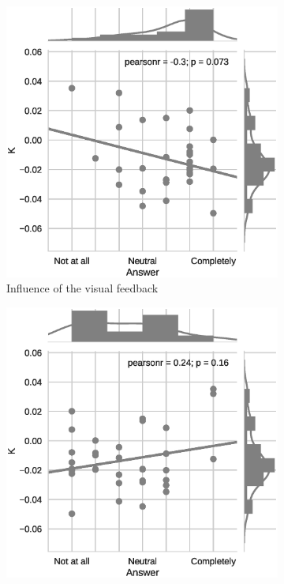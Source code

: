 \begin{figure}[t]
	\centering
	\begin{subfigure}[t]{.48\columnwidth}
		\centering        
		\includegraphics[trim={0cm 0cm 1cm 0cm},clip,width=\textwidth]{img/compelling}
		\caption{Influence of the visual feedback}
		\label{subfig:compelling}
	\end{subfigure}
	\begin{subfigure}[t]{.48\columnwidth}
		\centering        
		\includegraphics[trim={1.5cm 0cm 0cm 0cm},clip,width=\textwidth]{img/involvement}

\end{subfigure}
\end{figure}
